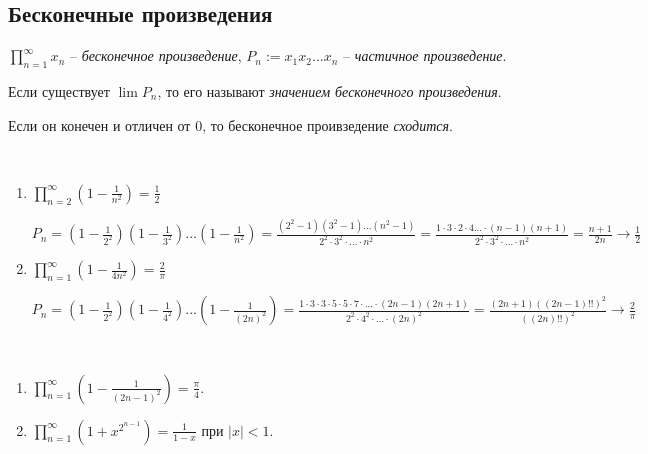 \subsection{Бесконечные произведения}

\begin{definition}
    $\prod\limits_{n=1}^\infty x_n$ – \textit{бесконечное произведение},  $P_n:=x_1x_2...x_n$ – \textit{частичное произведение}.

    Если существует $\lim P_n$, то его называют \textit{значением бесконечного произведения}.

    Если он конечен и отличен от $0$, то бесконечное проивзедение \textit{сходится}.
\end{definition}

\begin{example}~
    \begin{enumerate}
        \item $\prod\limits_{n=2}^\infty(1-\frac{1}{n^2})=\frac{1}{2}$

        $P_n=(1-\frac{1}{2^2})(1-\frac{1}{3^2})...(1-\frac{1}{n^2})=\frac{(2^2-1)(3^2-1)...(n^2-1)}{2^2\cdot 3^2\cdot...\cdot n^2}=\frac{1\cdot 3\cdot 2\cdot 4...\cdot (n-1)(n+1)}{2^2\cdot 3^2\cdot...\cdot n^2}=\frac{n+1}{2n}\rightarrow \frac{1}{2}$

        \item $\prod\limits_{n=1}^\infty(1-\frac{1}{4n^2})=\frac{2}{\pi}$

        $P_n=(1-\frac{1}{2^2})(1-\frac{1}{4^2})...(1-\frac{1}{(2n)^2})=\frac{1\cdot 3\cdot 3\cdot 5\cdot 5\cdot 7\cdot ...\cdot (2n-1)(2n+1)}{2^2\cdot 4^2\cdot...\cdot (2n)^2}=\frac{(2n+1)((2n-1)!!)^2}{((2n)!!)^2}\rightarrow \frac{2}{\pi}$
    \end{enumerate}
\end{example}

\begin{exercise}~
    \begin{enumerate}
        \item $\prod\limits_{n=1}^\infty(1-\frac{1}{(2n-1)^2})=\frac{\pi}{4}$.   
        \item $\prod\limits_{n=1}^\infty(1+x^{2^{n-1}})=\frac{1}{1-x}$ при $|x|<1$.   
    \end{enumerate}
\end{exercise}

